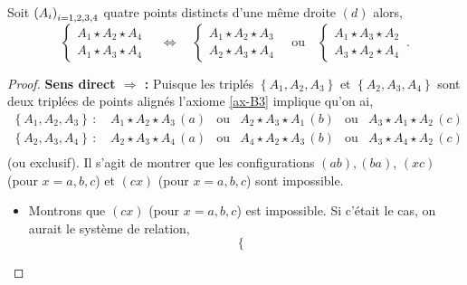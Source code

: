\begin{cor}\label{cor-configurationdespointsinterne}
    Soit $\left(A_{i}\right)_{i = 1,2,3,4}$ quatre points distincts d'une même droite $(d)$ alors,
    \begin{equation*}
        \left\{
        \begin{array}{cc}
             A_1 \star A_2 \star A_4  \\
             A_1 \star A_3 \star A_4 
        \end{array}
        \right. \quad \Longleftrightarrow \quad       
        \left\{\begin{array}{cc}
             A_1 \star A_2 \star A_3  \\
             A_2 \star A_3 \star A_4 
        \end{array}\right. \quad \text{ou} \quad
        \left\{\begin{array}{cc}
             A_1 \star A_3 \star A_2  \\
             A_3 \star A_2 \star A_4
        \end{array}\right.\,.
    \end{equation*}
    \begin{proof}
        \textbf{Sens direct $\Rightarrow$ : } Puisque les triplés $\left\{A_1,A_2,A_3\right\}$ et $\left\{A_2,A_3,A_4\right\}$ sont deux triplées de points alignés l'axiome \ref{ax-B3} implique qu'on ai,
        \begin{equation*}
            \begin{array}{cccccc}
                 \left\{A_1,A_2,A_3\right\}\,:\,& A_1 \star A_2 \star A_3 \,(a) & \text{ou} & A_2 \star A_3 \star A_1 \,(b) & \text{ou} & A_3 \star A_1 \star A_2 \,(c) \\
                 \left\{A_2,A_3,A_4\right\}\,:\,& A_2 \star A_3 \star A_4 \,(a) & \text{ou} & A_4 \star A_2 \star A_3 \,(b) & \text{ou} & A_3 \star A_4 \star A_2 \,(c) \\
            \end{array}
        \end{equation*}
        (ou exclusif). Il s'agit de montrer que les configurations $(ab),(ba)$, $(xc)$ (pour $x=a,b,c$) et $(cx)$ (pour $x=a,b,c$) sont impossible.
        \begin{itemize}[$\bullet$]
            \item Montrons que $(cx)$ (pour $x=a,b,c$) est impossible. Si c'était le cas, on aurait le système de relation,
            \begin{equation*}
                \left\{\begin{array}{cc}

\end{array}
\end{equation*}
\end{itemize}
\end{proof}
\end{cor}
